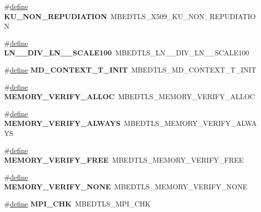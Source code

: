 \begin{DoxyCompactItemize}
\#\hyperlink{structdefine}{define} {\bfseries K\+U\+\_\+\+N\+O\+N\+\_\+\+R\+E\+P\+U\+D\+I\+A\+T\+I\+ON}~M\+B\+E\+D\+T\+L\+S\+\_\+\+X509\+\_\+\+K\+U\+\_\+\+N\+O\+N\+\_\+\+R\+E\+P\+U\+D\+I\+A\+T\+I\+ON
\item 
\mbox{\label{compat-1_83_8h_a97c90562c6192dfc2b8cf38152e1fa4b}} 
\#\hyperlink{structdefine}{define} {\bfseries L\+N\+\_\+\_\+\+D\+I\+V\+\_\+\+L\+N\+\_\+\_\+\+S\+C\+A\+L\+E100}~M\+B\+E\+D\+T\+L\+S\+\_\+\+L\+N\+\_\+\_\+\+D\+I\+V\+\_\+\+L\+N\+\_\+\_\+\+S\+C\+A\+L\+E100
\item 
\mbox{\label{compat-1_83_8h_a45b0c403a33ff1f73947597785cf5ca7}} 
\#\hyperlink{structdefine}{define} {\bfseries M\+D\+\_\+\+C\+O\+N\+T\+E\+X\+T\+\_\+\+T\+\_\+\+I\+N\+IT}~M\+B\+E\+D\+T\+L\+S\+\_\+\+M\+D\+\_\+\+C\+O\+N\+T\+E\+X\+T\+\_\+\+T\+\_\+\+I\+N\+IT
\item 
\mbox{\label{compat-1_83_8h_a129f05dbba09d85d2b880faeca2a6eff}} 
\#\hyperlink{structdefine}{define} {\bfseries M\+E\+M\+O\+R\+Y\+\_\+\+V\+E\+R\+I\+F\+Y\+\_\+\+A\+L\+L\+OC}~M\+B\+E\+D\+T\+L\+S\+\_\+\+M\+E\+M\+O\+R\+Y\+\_\+\+V\+E\+R\+I\+F\+Y\+\_\+\+A\+L\+L\+OC
\item 
\mbox{\label{compat-1_83_8h_a8e4c201d28d750e49911028b8062bb8f}} 
\#\hyperlink{structdefine}{define} {\bfseries M\+E\+M\+O\+R\+Y\+\_\+\+V\+E\+R\+I\+F\+Y\+\_\+\+A\+L\+W\+A\+YS}~M\+B\+E\+D\+T\+L\+S\+\_\+\+M\+E\+M\+O\+R\+Y\+\_\+\+V\+E\+R\+I\+F\+Y\+\_\+\+A\+L\+W\+A\+YS
\item 
\mbox{\label{compat-1_83_8h_adc781138868927caa03bfe4b58c4e80d}} 
\#\hyperlink{structdefine}{define} {\bfseries M\+E\+M\+O\+R\+Y\+\_\+\+V\+E\+R\+I\+F\+Y\+\_\+\+F\+R\+EE}~M\+B\+E\+D\+T\+L\+S\+\_\+\+M\+E\+M\+O\+R\+Y\+\_\+\+V\+E\+R\+I\+F\+Y\+\_\+\+F\+R\+EE
\item 
\mbox{\label{compat-1_83_8h_ae9b20acb59b74c83292f835ee94b2b42}} 
\#\hyperlink{structdefine}{define} {\bfseries M\+E\+M\+O\+R\+Y\+\_\+\+V\+E\+R\+I\+F\+Y\+\_\+\+N\+O\+NE}~M\+B\+E\+D\+T\+L\+S\+\_\+\+M\+E\+M\+O\+R\+Y\+\_\+\+V\+E\+R\+I\+F\+Y\+\_\+\+N\+O\+NE
\item 
\mbox{\label{compat-1_83_8h_af547433830b08cd9bded61f6b3cba077}} 
\#\hyperlink{structdefine}{define} {\bfseries M\+P\+I\+\_\+\+C\+HK}~M\+B\+E\+D\+T\+L\+S\+\_\+\+M\+P\+I\+\_\+\+C\+HK

\end{DoxyCompactItemize}

